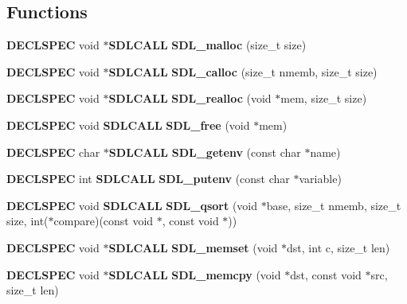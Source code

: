 \subsection*{Functions}
\begin{DoxyCompactItemize}
\item 
{\bf D\+E\+C\+L\+S\+P\+E\+C} void $\ast${\bf S\+D\+L\+C\+A\+L\+L} {\bfseries S\+D\+L\+\_\+malloc} (size\+\_\+t size)\label{_s_d_l__stdinc_8h_aa0843b5fde7f958b8eea238304aa5b2d}

\item 
{\bf D\+E\+C\+L\+S\+P\+E\+C} void $\ast${\bf S\+D\+L\+C\+A\+L\+L} {\bfseries S\+D\+L\+\_\+calloc} (size\+\_\+t nmemb, size\+\_\+t size)\label{_s_d_l__stdinc_8h_aee91cc8889e6d920b9bb6970b0274c96}

\item 
{\bf D\+E\+C\+L\+S\+P\+E\+C} void $\ast${\bf S\+D\+L\+C\+A\+L\+L} {\bfseries S\+D\+L\+\_\+realloc} (void $\ast$mem, size\+\_\+t size)\label{_s_d_l__stdinc_8h_a5123a34a3c99b29c423893aac78b4454}

\item 
{\bf D\+E\+C\+L\+S\+P\+E\+C} void {\bf S\+D\+L\+C\+A\+L\+L} {\bfseries S\+D\+L\+\_\+free} (void $\ast$mem)\label{_s_d_l__stdinc_8h_a0e4ade894d550ada1fa19dc2d46e88b8}

\item 
{\bf D\+E\+C\+L\+S\+P\+E\+C} char $\ast${\bf S\+D\+L\+C\+A\+L\+L} {\bfseries S\+D\+L\+\_\+getenv} (const char $\ast$name)\label{_s_d_l__stdinc_8h_a16ef7a64cf619b95d337ed87cf73cbaa}

\item 
{\bf D\+E\+C\+L\+S\+P\+E\+C} int {\bf S\+D\+L\+C\+A\+L\+L} {\bfseries S\+D\+L\+\_\+putenv} (const char $\ast$variable)\label{_s_d_l__stdinc_8h_a2563f8649eff13f301e12189b607c2c4}

\item 
{\bf D\+E\+C\+L\+S\+P\+E\+C} void {\bf S\+D\+L\+C\+A\+L\+L} {\bfseries S\+D\+L\+\_\+qsort} (void $\ast$base, size\+\_\+t nmemb, size\+\_\+t size, int($\ast$compare)(const void $\ast$, const void $\ast$))\label{_s_d_l__stdinc_8h_ae4e475d53a51a90992745186a20d1f01}

\item 
{\bf D\+E\+C\+L\+S\+P\+E\+C} void $\ast${\bf S\+D\+L\+C\+A\+L\+L} {\bfseries S\+D\+L\+\_\+memset} (void $\ast$dst, int c, size\+\_\+t len)\label{_s_d_l__stdinc_8h_a1aed2b44e47f090a85a75f359385acfe}

\item 
{\bf D\+E\+C\+L\+S\+P\+E\+C} void $\ast${\bf S\+D\+L\+C\+A\+L\+L} {\bfseries S\+D\+L\+\_\+memcpy} (void $\ast$dst, const void $\ast$src, size\+\_\+t len)\label{_s_d_l__stdinc_8h_ae225a37bf4a348e013474a193b1bfabc}


\end{DoxyCompactItemize}
